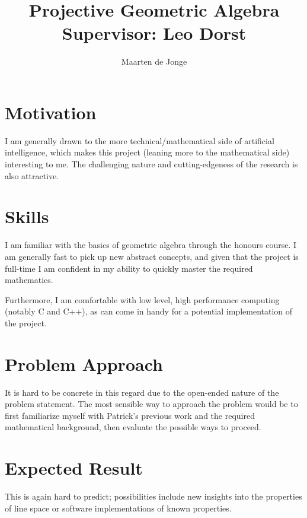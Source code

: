 \documentclass[a4paper, 11pt]{article}
\author{Maarten de Jonge}
\title{Projective Geometric Algebra \\
       \Large{Supervisor: Leo Dorst}}
\begin{document}
\maketitle

\section*{Motivation}
I am generally drawn to the more technical/mathematical side of artificial
intelligence, which makes this project (leaning more to the mathematical side)
interesting to me. The challenging nature and cutting-edgeness of the research
is also attractive.

\section*{Skills}
I am familiar with the basics of geometric algebra through the honours course. I
am generally fast to pick up new abstract concepts, and given that the project
is full-time I am confident in my ability to quickly master the required
mathematics.

Furthermore, I am comfortable with low level, high performance computing
(notably C and C++), as can come in handy for a potential implementation of
the project.

\section*{Problem Approach}
It is hard to be concrete in this regard due to the open-ended nature of the
problem statement. The most sensible way to approach the problem would be to
first familiarize myself with Patrick's previous work and the required
mathematical background, then evaluate the possible ways to proceed.

\section*{Expected Result}
This is again hard to predict; possibilities include new insights into the
properties of line space or software implementations of known properties.
	
\end{document}
